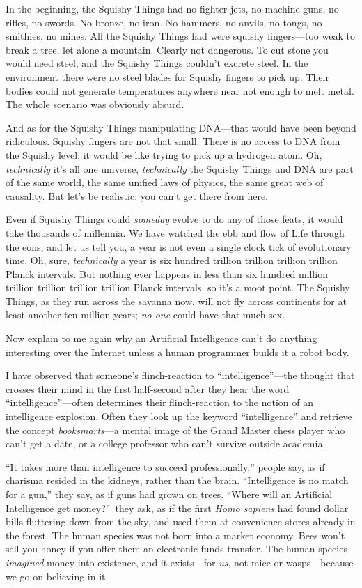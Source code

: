 {
 In the beginning, the Squishy Things had no fighter jets, no
machine guns, no rifles, no swords. No bronze, no iron. No hammers, no
anvils, no tongs, no smithies, no mines. All the Squishy Things had
were squishy fingers---too weak to break a tree, let alone a mountain.
Clearly not dangerous. To cut stone you would need steel, and the
Squishy Things couldn't excrete steel. In the
environment there were no steel blades for Squishy fingers to pick up.
Their bodies could not generate temperatures anywhere near hot enough
to melt metal. The whole scenario was obviously absurd.}

{
 And as for the Squishy Things manipulating DNA---that would have
been beyond ridiculous. Squishy fingers are not that small. There is no
access to DNA from the Squishy level; it would be like trying to pick
up a hydrogen atom. Oh, \textit{technically} it's all
one universe, \textit{technically} the Squishy Things and DNA are part
of the same world, the same unified laws of physics, the same great web
of causality. But let's be realistic: you
can't get there from here.}

{
 Even if Squishy Things could \textit{someday} evolve to do any of
those feats, it would take thousands of millennia. We have watched the
ebb and flow of Life through the eons, and let us tell you, a year is
not even a single clock tick of evolutionary time. Oh, sure,
\textit{technically} a year is six hundred trillion trillion trillion
trillion Planck intervals. But nothing ever happens in less than six
hundred million trillion trillion trillion trillion Planck intervals,
so it's a moot point. The Squishy Things, as they run
across the savanna now, will not fly across continents for at least
another ten million years; \textit{no one} could have that much sex.}

{
 Now explain to me again why an Artificial Intelligence
can't do anything interesting over the Internet unless
a human programmer builds it a robot body.}

{
 I have observed that someone's flinch-reaction to
``intelligence''---the thought that
crosses their mind in the first half-second after they hear the word
``intelligence''---often determines
their flinch-reaction to the notion of an intelligence explosion. Often
they look up the keyword
``intelligence'' and retrieve the
concept \textit{booksmarts}{}---a mental image of the Grand Master
chess player who can't get a date, or a college
professor who can't survive outside academia.}

{
 ``It takes more than intelligence to succeed
professionally,'' people say, as if charisma resided
in the kidneys, rather than the brain. ``Intelligence
is no match for a gun,'' they say, as if guns had
grown on trees. ``Where will an Artificial
Intelligence get money?''~they ask, as if the first
\textit{Homo sapiens} had found dollar bills fluttering down from the
sky, and used them at convenience stores already in the forest. The
human species was not born into a market economy. Bees
won't sell you honey if you offer them an electronic
funds transfer. The human species \textit{imagined} money into
existence, and it exists---for \textit{us}, not mice or wasps---because
we go on believing in it.}

